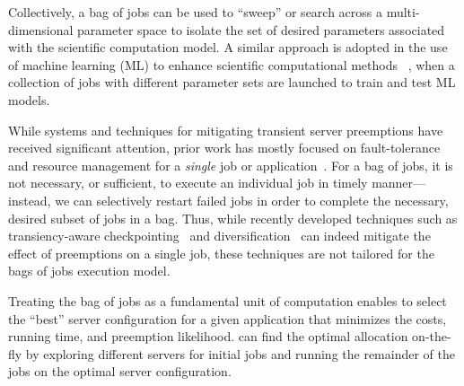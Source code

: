 
Collectively, a bag of jobs can be used to ``sweep'' or search across a multi-dimensional parameter space to isolate the set of desired parameters associated with the scientific computation model.
A similar approach is adopted in the use of machine learning (ML) to enhance scientific computational methods ~\cite{ml.atomic2017,melko2017,sam2017,fu2017,long2015machine, ferguson2017machine,ward2018matminer}, when a collection of jobs with different  parameter sets are launched to train and test ML models.



While systems and techniques for mitigating transient server preemptions have received significant attention, prior work has mostly focused on fault-tolerance and resource management for a \emph{single} job or application~\cite{spoton, exosphere, flint, marathe2014exploiting}. 
For a bag of jobs, it is not necessary, or sufficient, to execute an individual job in timely manner---instead, we can selectively restart failed jobs in order to complete the necessary, desired subset of jobs in a bag.
Thus, while recently developed techniques such as transiency-aware checkpointing~\cite{marathe2014exploiting, flint}
and diversification~\cite{exosphere, spotweb} can indeed mitigate the effect of preemptions on a single job, these techniques are not tailored for the bags of jobs execution model. 


%
Treating the bag of jobs as a fundamental unit of computation enables \sysname to select the ``best'' server configuration for a given application that minimizes the costs, running time, and preemption likelihood.
\sysname can find the optimal allocation on-the-fly by exploring different servers for initial jobs and running the remainder of the jobs on the optimal server configuration. 

